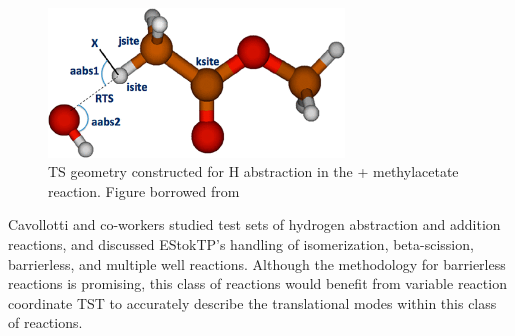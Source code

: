 \documentclass[preprint, 11pt]{elsarticle} %
\begin{document}
\begin{figure}
    \centering
    \includegraphics[width=0.7\textwidth]{estoktp_habstraction.png}
    \caption{TS geometry constructed for H abstraction in the  + methylacetate reaction. Figure borrowed from \cite{estoktp:2018}}
    \label{fig:estoktp_habstraction}
\end{figure}

Cavollotti and co-workers studied test sets of hydrogen abstraction and addition reactions, and discussed EStokTP's handling of isomerization, beta-scission, barrierless, and multiple well reactions.
Although the methodology for barrierless reactions is promising, this class of reactions would benefit from variable reaction coordinate TST to accurately describe the translational modes within this class of reactions.
\end{document}
